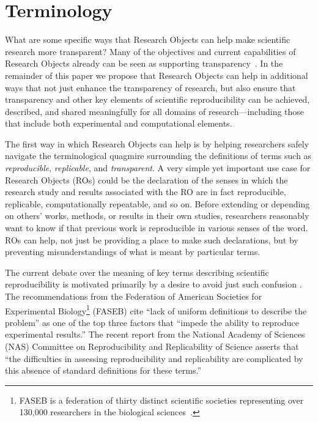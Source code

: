 \section{Terminology}\label{sec-terminology}

What are some specific ways that Research Objects \cite{bechhofer2013whya} can help
	make scientific research more transparent?
Many of the objectives and current capabilities of Research Objects already can be seen as supporting
	transparency~\cite{mecum2018preservingc}.
In the remainder of this paper we propose that Research Objects can help in additional ways that not
	just enhance the transparency of research, but also ensure that transparency and other key elements
	of scientific reproducibility can be achieved, described, and shared meaningfully for all domains
	of research---including those that include both experimental and computational elements.

The first way in which Research Objects can help is by helping researchers safely navigate the
	terminological quagmire surrounding the definitions of terms such as \emph{reproducible},
	\emph{replicable}, and \emph{transparent}.
A very simple yet important use case for Research Objects (ROs) could be the declaration of the senses in
	which the research study and results associated with the RO are in fact reproducible, replicable,
	computationally repeatable, and so on.
Before extending or depending on others' works, methods, or results in their own studies, researchers
	reasonably want to know if that previous work is reproducible in various senses of the word.
ROs can help, not just be providing a place to make such declarations, but by preventing
	misunderstandings of what is meant by particular terms.

The current debate over the meaning of key terms describing
	scientific reproducibility is motivated primarily by a desire to avoid just such confusion \cite{drummond2009replicability,goodman2016what,rauber16primad,herouxtoward,plesser2018reproducibility,barba2018terminologies,committeeonreproducibilityandreplicabilityinscience2019reproducibility}.
The recommendations from the Federation of
	American Societies for Experimental Biology\footnote{FASEB is a federation of thirty distinct
    scientific societies representing over 130,000 researchers in the biological sciences~\cite{faseb_home}.}
	(FASEB)
	\cite{FASEB2016enhancing} cite ``lack of uniform definitions to describe the problem''
	as one of the top three factors that ``impede the ability to reproduce experimental results.''
 The recent report from the National Academy of Sciences (NAS) Committee on Reproducibility and Replicability of Science \cite{committeeonreproducibilityandreplicabilityinscience2019reproducibility} asserts
	that ``the difficulties in assessing reproducibility and replicability are complicated by this absence of
	standard definitions for these terms.''

